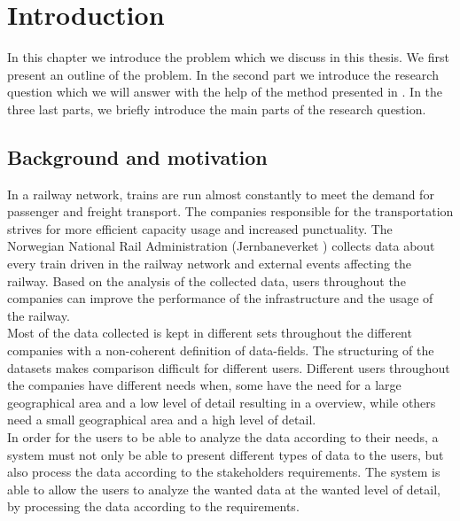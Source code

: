 
\chapter{Introduction}
\label{chapter:introduction}

In this chapter we introduce the problem which we discuss in this thesis.
We first present an outline of the problem. In the second part we introduce 
the research question which we will answer with the help of the method 
presented in . In the three last parts, 
we briefly introduce the main parts of the research question.

\section{Background and motivation} %
\label{sec:background_and_motivation}
In a railway network, trains are run almost constantly to meet the demand for 
passenger and freight transport. The companies responsible for the 
transportation strives for more efficient capacity usage and increased 
punctuality. The Norwegian National Rail Administration (Jernbaneverket 
\cite{jernbaneverketAbout}) collects data about every train driven in the 
railway network and external events affecting the railway. 
Based on the analysis of the collected data, users throughout the companies 
can improve the performance of the infrastructure and the usage of the 
railway.\\

Most of the data collected is kept in different sets throughout the different
companies with a non-coherent definition of data-fields. The structuring of 
the datasets makes comparison difficult for different users. Different users
throughout the companies have different needs when, some have
the need for a large geographical area and a low level of detail resulting in a
overview, while others need a small geographical area and a high level of 
detail. \\

In order for the users to be able to analyze the data according to their 
needs, a system must not only be able to present different types of data to the
users, but also process the data according to the stakeholders requirements. 
The system is able to allow the users to analyze the wanted data at the wanted 
level of detail, by processing the data according to the requirements.

